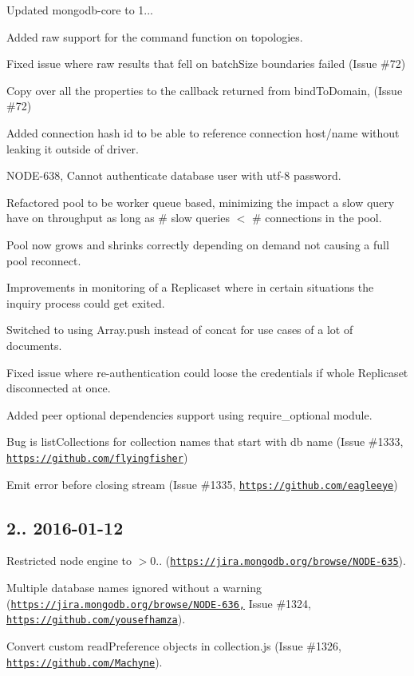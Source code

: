 \begin{DoxyItemize}
\item Updated mongodb-\/core to 1...
\item Added raw support for the command function on topologies.
\item Fixed issue where raw results that fell on batch\+Size boundaries failed (Issue \#72)
\item Copy over all the properties to the callback returned from bind\+To\+Domain, (Issue \#72)
\item Added connection hash id to be able to reference connection host/name without leaking it outside of driver.
\item N\+O\+D\+E-\/638, Cannot authenticate database user with utf-\/8 password.
\item Refactored pool to be worker queue based, minimizing the impact a slow query have on throughput as long as \# slow queries $<$ \# connections in the pool.
\item Pool now grows and shrinks correctly depending on demand not causing a full pool reconnect.
\item Improvements in monitoring of a Replicaset where in certain situations the inquiry process could get exited.
\item Switched to using Array.\+push instead of concat for use cases of a lot of documents.
\item Fixed issue where re-\/authentication could loose the credentials if whole Replicaset disconnected at once.
\item Added peer optional dependencies support using require\+\_\+optional module.
\item Bug is list\+Collections for collection names that start with db name (Issue \#1333, \href{https://github.com/flyingfisher}{\tt https\+://github.\+com/flyingfisher})
\item Emit error before closing stream (Issue \#1335, \href{https://github.com/eagleeye}{\tt https\+://github.\+com/eagleeye})
\end{DoxyItemize}

\subsection*{2.. 2016-\/01-\/12 }


\begin{DoxyItemize}
\item Restricted node engine to $>$0.. (\href{https://jira.mongodb.org/browse/NODE-635}{\tt https\+://jira.\+mongodb.\+org/browse/\+N\+O\+D\+E-\/635}).
\item Multiple database names ignored without a warning (\href{https://jira.mongodb.org/browse/NODE-636,}{\tt https\+://jira.\+mongodb.\+org/browse/\+N\+O\+D\+E-\/636,} Issue \#1324, \href{https://github.com/yousefhamza}{\tt https\+://github.\+com/yousefhamza}).
\item Convert custom read\+Preference objects in collection.\+js (Issue \#1326, \href{https://github.com/Machyne}{\tt https\+://github.\+com/\+Machyne}).
\end{DoxyItemize}

